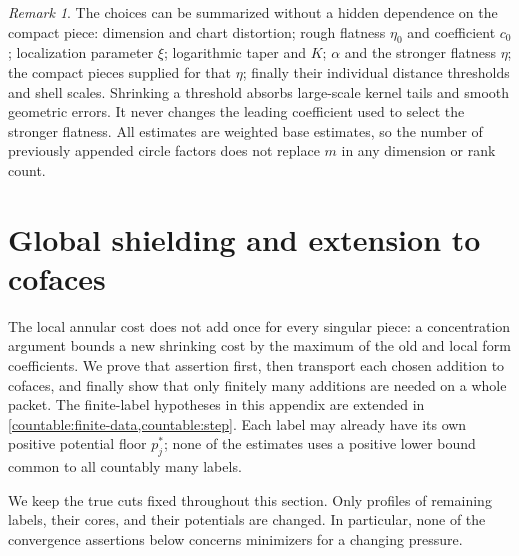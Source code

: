\documentclass[11pt]{article}
\numberwithin{equation}{section}
\theoremstyle{definition}
\theoremstyle{remark}
\newtheorem{remark}[theorem]{Remark}
\begin{document}
\begin{remark}\label{local:choice-order}
The choices can be summarized without a hidden dependence on the
compact piece: dimension and chart distortion; rough flatness
$\eta_0$ and coefficient $c_0$; localization parameter $\xi$;
logarithmic taper and $K$; $\alpha$ and the stronger flatness $\eta$;
the compact pieces supplied for that $\eta$; finally their individual
distance thresholds and shell scales.  Shrinking a threshold absorbs
large-scale kernel tails and smooth geometric errors.  It never
changes the leading coefficient used to select the stronger
flatness.  All estimates are weighted base estimates, so the number
of previously appended circle factors does not replace $m$ in any
dimension or rank count.
\end{remark}

\section{Global shielding and extension to cofaces}\label{sec:shield-global}

The local annular cost does not add once for every singular piece:
a concentration argument bounds a new shrinking cost by the maximum
of the old and local form coefficients.  We prove that assertion first,
then transport each chosen addition to cofaces, and finally show that
only finitely many additions are needed on a whole packet.
The finite-label hypotheses in this appendix are extended in
\cref{countable:finite-data,countable:step}.  Each label may already
have its own positive potential floor $p_j^*$; none of the estimates
uses a positive lower bound common to all countably many labels.

We keep the true cuts fixed throughout this section.  Only profiles of
remaining labels, their cores, and their potentials are changed.  In
particular, none of the convergence assertions below concerns minimizers
for a changing pressure.
\end{document}
